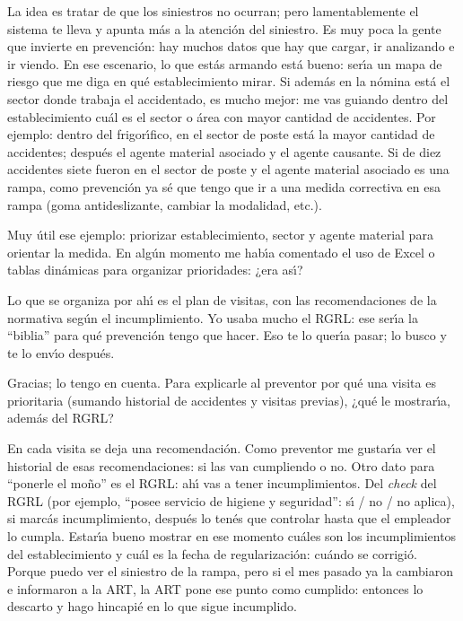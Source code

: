 \begin{description}[style=nextline, leftmargin=0cm, labelsep=0.35cm]
\item[\textbf{Entrevistado:}]
La idea es tratar de que los siniestros no ocurran; pero lamentablemente el sistema te lleva y apunta m\'as a la atenci\'on del siniestro.
Es muy poca la gente que invierte en prevenci\'on: hay muchos datos que hay que cargar, ir analizando e ir viendo.
En ese escenario, lo que est\'as armando est\'a bueno: ser\'{\i}a un mapa de riesgo que me diga en qu\'e establecimiento mirar.
Si adem\'as en la n\'omina est\'a el sector donde trabaja el accidentado, es mucho mejor: me vas guiando dentro del establecimiento cu\'al es el sector o \'area con mayor cantidad de accidentes.
Por ejemplo: dentro del frigor\'{\i}fico, en el sector de poste est\'a la mayor cantidad de accidentes; despu\'es el agente material asociado y el agente causante.
Si de diez accidentes siete fueron en el sector de poste y el agente material asociado es una rampa, como prevenci\'on ya s\'e que tengo que ir a una medida correctiva en esa rampa (goma antideslizante, cambiar la modalidad, etc.).

\item[\textbf{Entrevistador:}]
Muy \'util ese ejemplo: priorizar establecimiento, sector y agente material para orientar la medida.
En alg\'un momento me hab\'{\i}a comentado el uso de Excel o tablas din\'amicas para organizar prioridades: ¿era as\'{\i}?

\item[\textbf{Entrevistado:}]
Lo que se organiza por ah\'{\i} es el plan de visitas, con las recomendaciones de la normativa seg\'un el incumplimiento.
Yo usaba mucho el RGRL: ese ser\'{\i}a la ``biblia'' para qu\'e prevenci\'on tengo que hacer.
Eso te lo quer\'{\i}a pasar; lo busco y te lo env\'{\i}o despu\'es.

\item[\textbf{Entrevistador:}]
Gracias; lo tengo en cuenta.
Para explicarle al preventor por qu\'e una visita es prioritaria (sumando historial de accidentes y visitas previas), ¿qu\'e le mostrar\'{\i}a, adem\'as del RGRL?

\item[\textbf{Entrevistado:}]
En cada visita se deja una recomendaci\'on.
Como preventor me gustar\'{\i}a ver el historial de esas recomendaciones: si las van cumpliendo o no.
Otro dato para ``ponerle el mo\~no'' es el RGRL: ah\'{\i} vas a tener incumplimientos.
Del \emph{check} del RGRL (por ejemplo, ``posee servicio de higiene y seguridad'': s\'{\i} / no / no aplica), si marc\'as incumplimiento, despu\'es lo ten\'es que controlar hasta que el empleador lo cumpla.
Estar\'{\i}a bueno mostrar en ese momento cu\'ales son los incumplimientos del establecimiento y cu\'al es la fecha de regularizaci\'on: cu\'ando se corrigi\'o.
Porque puedo ver el siniestro de la rampa, pero si el mes pasado ya la cambiaron e informaron a la ART, la ART pone ese punto como cumplido: entonces lo descarto y hago hincapi\'e en lo que sigue incumplido.


\end{description}
